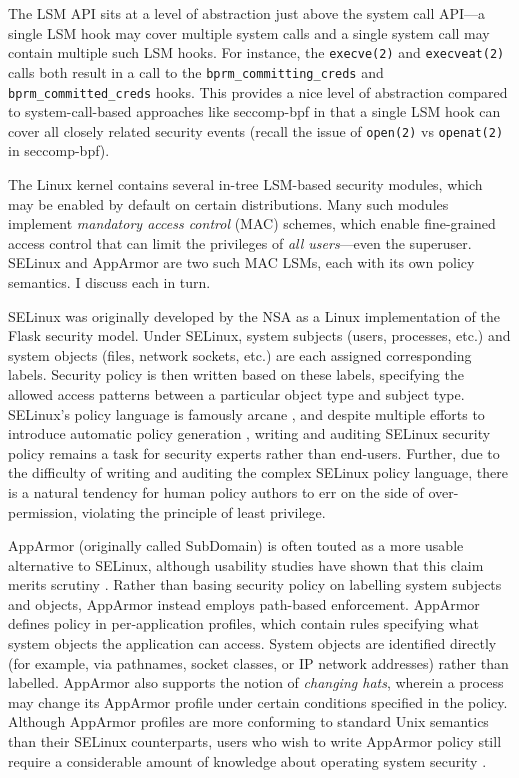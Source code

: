 \documentclass[dvipsnames, 12pt]{article}
\begin{document}
The LSM API sits at a level of abstraction just above the system call API---a
single LSM hook may cover multiple system calls and a single system call may
contain multiple such LSM hooks. For instance, the \texttt{execve(2)} and
\texttt{execveat(2)} calls both result in a call to the
\texttt{bprm\_committing\_creds} and  \texttt{bprm\_committed\_creds} hooks.
This provides a nice level of abstraction compared to system-call-based
approaches like seccomp-bpf \cite{seccomp_bpf, drewry2012_seccomp_bpf} in that
a single LSM hook can cover all closely related security events (recall the
issue of \texttt{open(2)} vs \texttt{openat(2)} in seccomp-bpf).

The Linux kernel contains several in-tree LSM-based security modules, which may
be enabled by default on certain distributions.  Many such modules implement
\textit{mandatory access control} (MAC) schemes, which enable fine-grained
access control that can limit the privileges of \textit{all users}---even the
superuser. SELinux \cite{smalley2001_selinux} and AppArmor
\cite{cowan2000_apparmor} are two such MAC LSMs, each with its own policy
semantics. I discuss each in turn.

SELinux \cite{smalley2001_selinux} was originally developed by the NSA as
a Linux implementation of the Flask \cite{spencer1999_flask} security model.
Under SELinux, system subjects (users, processes, etc.) and system objects
(files, network sockets, etc.) are each assigned corresponding labels. Security
policy is then written based on these labels, specifying the allowed access
patterns between a particular object type and subject type. SELinux's policy
language is famously arcane \cite{schreuders12_towards}, and despite multiple
efforts to introduce automatic policy generation \cite{audit2allow,
macmillan07_madison, macmillan07_madison}, writing and auditing SELinux security
policy remains a task for security experts rather than end-users. Further, due
to the difficulty of writing and auditing the complex SELinux policy language,
there is a natural tendency for human policy authors to err on the side of
over-permission, violating the principle of least privilege.

AppArmor (originally called SubDomain) \cite{cowan2000_apparmor} is often touted
as a more usable alternative to SELinux, although usability studies have shown
that this claim merits scrutiny \cite{schreuders12_towards}. Rather than basing
security policy on labelling system subjects and objects, AppArmor instead
employs path-based enforcement. AppArmor defines policy in per-application
profiles, which contain rules specifying what system objects the application can
access. System objects are identified directly (for example, via pathnames,
socket classes, or IP network addresses) rather than labelled.  AppArmor also
supports the notion of \textit{changing hats}, wherein a process may change its
AppArmor profile under certain conditions specified in the policy.  Although
AppArmor profiles are more conforming to standard Unix semantics than their
SELinux counterparts, users who wish to write AppArmor policy still require
a considerable amount of knowledge about operating system security
\cite{schreuders12_towards}.
\end{document}
